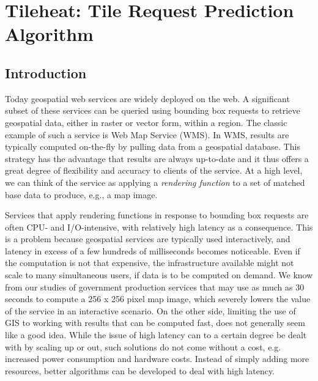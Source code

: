 \documentclass[11pt, oneside]{report}
\begin{document}
{%



\chapter{Tileheat: Tile Request Prediction Algorithm}
\label{chapter:tileheat}
\section{Introduction}

Today geospatial web services are widely deployed on the web. A significant subset of these services can be queried using bounding box requests to retrieve geospatial data, either in raster or vector form, within a region. The classic example of such a service is Web Map Service (WMS). In WMS, results are typically computed on-the-fly by pulling data from a geospatial database. This strategy has the advantage that results are always up-to-date and it thus offers a great degree of flexibility and accuracy to clients of the service. At a high level, we can think of the service as applying a \emph{rendering function} to a set of matched base data to produce, e.g., a map image.

Services that apply rendering functions in response to bounding box requests are often CPU- and I/O-intensive, with relatively high latency as a consequence. This is a problem because geospatial services are typically used interactively, and latency in excess of a few hundreds of milliseconds becomes noticeable. Even if the computation is not that expensive, the infrastructure available might not scale to many simultaneous users, if data is to be computed on demand. We know from our studies of government production services that may use as much as 30 seconds to compute a 256 x 256 pixel map image, which severely lowers the value of the service in an interactive scenario. On the other side, limiting the use of GIS to working with results that can be computed fast, does not generally seem like a good idea. While the issue of high latency can to a certain degree be dealt with by scaling up or out, such solutions do not come without a cost, e.g. increased power consumption and hardware costs. Instead of simply adding more resources, better algorithms can be developed to deal with high latency.

}
\end{document}
